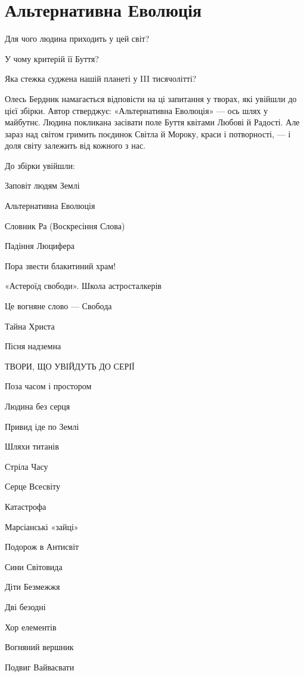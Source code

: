  
 

\section{Альтернативна Еволюція}

Для чого людина приходить у цей світ?

У чому критерій її Буття?

Яка стежка суджена нашій планеті у III тисячолітті?

Олесь Бердник намагається відповісти на ці запитання у творах, які увійшли до
цієї збірки. Автор стверджує: «Альтернативна Еволюція» — ось шлях у майбутнє.
Людина покликана засівати поле Буття квітами Любові й Радості. Але зараз над
світом гримить поєдинок Світла й Мороку, краси і потворності, — і доля світу
залежить від кожного з нас.

До збірки увійшли:

Заповіт людям Землі

Альтернативна Еволюція

Словник Ра (Воскресіння Слова)

Падіння Люцифера

Пора звести блакитиний храм!

«Астероїд свободи». Школа астросталкерів

Це вогняне слово — Свобода

Тайна Христа

Пісня надземна

ТВОРИ, ЩО УВІЙДУТЬ ДО СЕРІЇ

Поза часом і простором

Людина без серця

Привид іде по Землі

Шляхи титанів

Стріла Часу

Серце Всесвіту

Катастрофа

Марсіанські «зайці»

Подорож в Антисвіт

Сини Світовида

Діти Безмежжя

Дві безодні

Хор елементів

Вогняний вершник

Подвиг Вайвасвати

